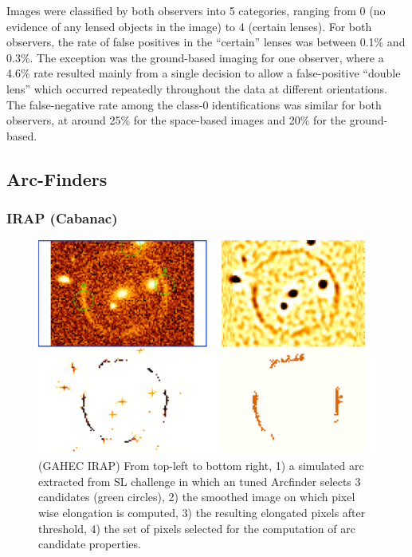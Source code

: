 \documentclass[useAMS,usenatbib]{mnras}
\begin{document}
Images were classified by both observers into 5 categories, ranging from
0 (no evidence of any lensed objects in the image) to 4 (certain lenses).
For both observers, the rate of false positives in the ``certain'' lenses
was between 0.1\% and 0.3\%. The exception was the ground-based imaging 
for one observer, where a 4.6\% rate resulted mainly from a
single decision to allow a false-positive ``double lens'' which occurred
repeatedly throughout the data at different orientations. The false-negative
rate among the class-0 identifications was similar for both observers, at
around 25\% for the space-based images and 20\% for the ground-based.

\subsection{Arc-Finders}
\subsubsection{ IRAP (Cabanac)}

\begin{figure}
 \includegraphics[width=\columnwidth]{figures/arcmethod.pdf}
 \caption{ (GAHEC IRAP) From top-left to bottom right, 1) a simulated arc extracted from SL challenge in which an tuned Arcfinder selects 3 candidates (green circles), 2) the smoothed image on which pixel wise elongation is computed, 3) the resulting elongated pixels after threshold, 4) the set of pixels selected for the computation of arc candidate properties. }
 \label{fig:Cabanac}
\end{figure}
\end{document}
